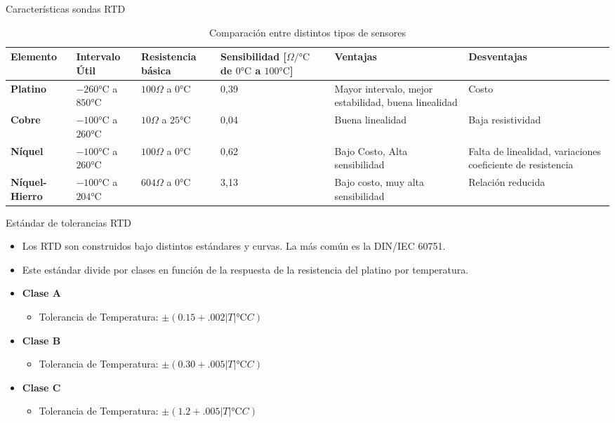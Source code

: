 \documentclass[aspectratio=169]{beamer}
\begin{document}
\begin{frame}{Características sondas RTD}
  \begin{table}[]
    \centering
    \scriptsize{
    \begin{tabular}{m{1.1cm} m{2.2cm} m{1.5cm} m{1.8cm} m{2.6cm} m{2.6cm}}
    \toprule
        \textbf{Elemento} & \textbf{Intervalo Útil} &\textbf{Resistencia básica} & \textbf{Sensibilidad [$\Omega/\si{\celsius}$ de $0\si{\celsius}$ a $100\si{\celsius}$]} & \textbf{Ventajas} & \textbf{Desventajas}\\
    \midrule
       \textbf{Platino} & $-260\si{\celsius}$ a $ 850\si{\celsius}$ & $100\Omega$ a $0\si{\celsius}$   & 0,39 & Mayor intervalo, mejor estabilidad, buena linealidad & Costo\\
       \textbf{Cobre} & $-100\si{\celsius}$ a $ 260\si{\celsius}$ & $10\Omega$ a $25\si{\celsius}$   & 0,04 & Buena linealidad & Baja resistividad\\
       \textbf{Níquel} &  $-100\si{\celsius}$ a $ 260\si{\celsius}$ & $100\Omega$ a $0\si{\celsius}$   & 0,62 & Bajo Costo, Alta sensibilidad & Falta de linealidad, variaciones coeficiente de resistencia\\
       \textbf{Níquel-Hierro} & $-100\si{\celsius}$ a $ 204\si{\celsius}$ & $604\Omega$ a $0\si{\celsius}$   & 3,13 & Bajo costo, muy alta sensibilidad & Relación reducida\\
    \bottomrule
    \end{tabular}
    }
    \caption{Comparación entre distintos tipos de sensores\cite{sole2005instrumentacion}}
    \label{tab:Caracteristicas _rtd}
\end{table}
\end{frame}
\begin{frame}{Estándar de tolerancias RTD}
 \begin{itemize}
     \item Los RTD son construidos bajo distintos estándares y curvas. La más común es la DIN/IEC 60751.
     \item Este estándar divide por clases en función de la respuesta de la resistencia del platino por temperatura. 
     \item \textbf{Clase A}
     \begin{itemize}
         \item Tolerancia de Temperatura: $\pm (0.15 + .002|T| \si{\celsius} C)$
     \end{itemize}
      \item \textbf{Clase B}
     \begin{itemize}
         \item Tolerancia de Temperatura: $\pm (0.30 + .005|T| \si{\celsius} C)$
         \end{itemize}
    \item \textbf{Clase C}
     \begin{itemize}
         \item Tolerancia de Temperatura: $\pm (1.2 + .005|T| \si{\celsius} C)$
     \end{itemize}
 \end{itemize}
\end{frame}
\end{document}
